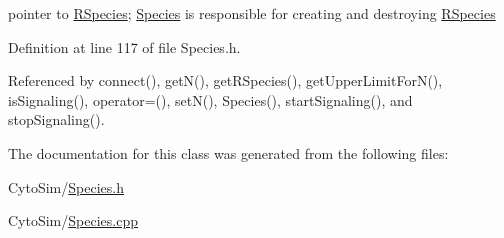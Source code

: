 pointer to \hyperlink{classchem_1_1RSpecies}{R\-Species}; \hyperlink{classchem_1_1Species}{Species} is responsible for creating and destroying \hyperlink{classchem_1_1RSpecies}{R\-Species} 



Definition at line 117 of file Species.\-h.



Referenced by connect(), get\-N(), get\-R\-Species(), get\-Upper\-Limit\-For\-N(), is\-Signaling(), operator=(), set\-N(), Species(), start\-Signaling(), and stop\-Signaling().



The documentation for this class was generated from the following files\-:\begin{DoxyCompactItemize}
\item 
Cyto\-Sim/\hyperlink{Species_8h}{Species.\-h}\item 
Cyto\-Sim/\hyperlink{Species_8cpp}{Species.\-cpp}\end{DoxyCompactItemize}
